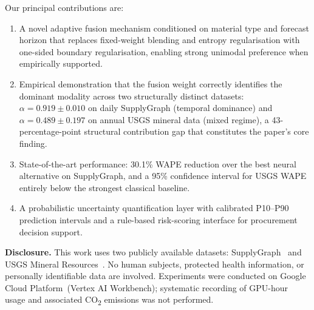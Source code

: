 Our principal contributions are:

\begin{enumerate}[leftmargin=*, nosep]
  \item A novel adaptive fusion mechanism conditioned on material
    type and forecast horizon that replaces fixed-weight blending
    and entropy regularisation with one-sided boundary
    regularisation, enabling strong unimodal preference when
    empirically supported.
  \item Empirical demonstration that the fusion weight correctly
    identifies the dominant modality across two structurally
    distinct datasets: $\alpha{=}0.919{\pm}0.010$ on daily
    SupplyGraph (temporal dominance) and $\alpha{=}0.489{\pm}0.197$
    on annual USGS mineral data (mixed regime), a 43-percentage-point
    structural contribution gap that constitutes the paper's core
    finding.
  \item State-of-the-art performance: 30.1\% WAPE reduction over the
    best neural alternative on SupplyGraph, and a 95\% confidence
    interval for USGS WAPE entirely below the strongest classical
    baseline.
  \item A probabilistic uncertainty quantification layer with
    calibrated P10--P90 prediction intervals and a rule-based
    risk-scoring interface for procurement decision support.
\end{enumerate}

\smallskip
\noindent\textbf{Disclosure.} This work uses two publicly available
datasets: SupplyGraph~\cite{wasi2024supplygraph} and USGS Mineral
Resources~\cite{usgs2023minerals}. No human subjects, protected
health information, or personally identifiable data are involved.
Experiments were conducted on Google Cloud Platform~(Vertex AI
Workbench); systematic recording of GPU-hour usage and associated
CO\textsubscript{2} emissions was not performed.

